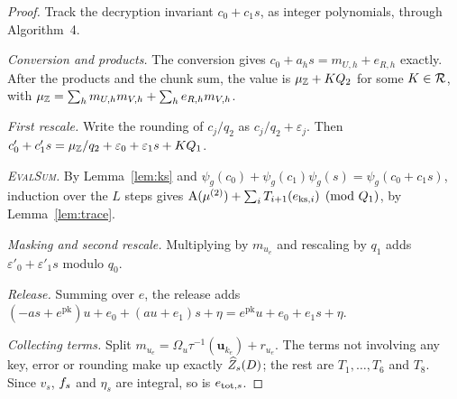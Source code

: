 \begin{proof}
Track the decryption invariant $c_0+c_1s$, as integer polynomials, through Algorithm~4.

\emph{Conversion and products.} The conversion gives $c_0+a_hs=m_{U,h}+e_{R,h}$ exactly. After the products and the chunk sum, the value is $\mu_{\mathbb{Z}}+KQ_2$ for some $K\in\mathcal{R}$, with $\mu_{\mathbb{Z}}=\sum_hm_{U,h}m_{V,h}+\sum_he_{R,h}m_{V,h}$.

\emph{First rescale.} Write the rounding of $c_j/q_2$ as $c_j/q_2+\varepsilon_j$. Then $c_0'+c_1's=\mu_{\mathbb{Z}}/q_2+\varepsilon_0+\varepsilon_1s+KQ_1$.

\emph{\textsc{EvalSum}.} By Lemma~\ref{lem:ks} and $\psi_g(c_0)+\psi_g(c_1)\psi_g(s)=\psi_g(c_0+c_1s)$, induction over the $L$ steps gives $\mathrm{A}(\mu^{(2)})+\sum_iT_{i+1}(e_{\mathrm{ks},i})\pmod{Q_1}$, by Lemma~\ref{lem:trace}.

\emph{Masking and second rescale.} Multiplying by $m_{u_e}$ and rescaling by $q_1$ adds $\varepsilon'_0+\varepsilon'_1s$ modulo $q_0$.

\emph{Release.} Summing over $e$, the release adds $(-as+e^{\mathrm{pk}})u+e_0+(au+e_1)s+\eta=e^{\mathrm{pk}}u+e_0+e_1s+\eta$.

\emph{Collecting terms.} Split $m_{u_e}=\Omega_u\tau^{-1}(\mathbf u_{k_e})+r_{u_e}$. The terms not involving any key, error or rounding make up exactly $\widehat Z_s(D)$; the rest are $T_1,\dots,T_6$ and $T_8$. Since $v_s$, $f_s$ and $\eta_s$ are integral, so is $e_{\mathrm{tot},s}$.
\end{proof}

